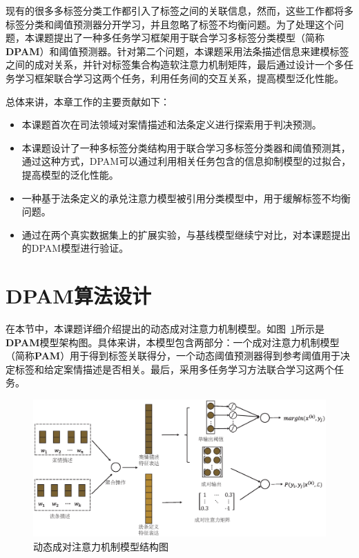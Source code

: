 现有的很多多标签分类工作都引入了标签之间的关联信息，然而，这些工作都将多标签分类和阈值预测器分开学习，并且忽略了标签不均衡问题。为了处理这个问题，本课题提出了一种多任务学习框架用于联合学习多标签分类模型（简称\textbf{DPAM}）和阈值预测器。针对第二个问题，本课题采用法条描述信息来建模标签之间的成对关系，并针对标签集合构造软注意力机制矩阵，最后通过设计一个多任务学习框架联合学习这两个任务，利用任务间的交互关系，提高模型泛化性能。

总体来讲，本章工作的主要贡献如下：
\begin{itemize}
    \item 本课题首次在司法领域对案情描述和法条定义进行探索用于判决预测。
    \item 本课题设计了一种多标签分类结构用于联合学习多标签分类器和阈值预测其，通过这种方式，DPAM可以通过利用相关任务包含的信息抑制模型的过拟合，提高模型的泛化性能。
    \item 一种基于法条定义的承兑注意力模型被引用分类模型中，用于缓解标签不均衡问题。
    \item 通过在两个真实数据集上的扩展实验，与基线模型继续宁对比，对本课题提出的DPAM模型进行验证。
\end{itemize}

\section{DPAM算法设计}
\label{sec:dpam_algori}

在本节中，本课题详细介绍提出的动态成对注意力机制模型。如图~\ref{fig:model}所示是\textbf{DPAM}模型架构图。具体来讲，本模型包含两部分：一个成对注意力机制模型（简称\textbf{PAM}）用于得到标签关联得分，一个动态阈值预测器得到参考阈值用于决定标签和给定案情描述是否相关。最后，采用多任务学习方法联合学习这两个任务。

\begin{figure}[htb]
\centering
\includegraphics[scale=0.48,viewport=0 30 980 500,clip=true]{./sources/dpam_DPAM.eps}
\vspace{-10pt}
\caption{\label{fig:model} 动态成对注意力机制模型结构图 }
\vspace{-5pt}
\end{figure}


